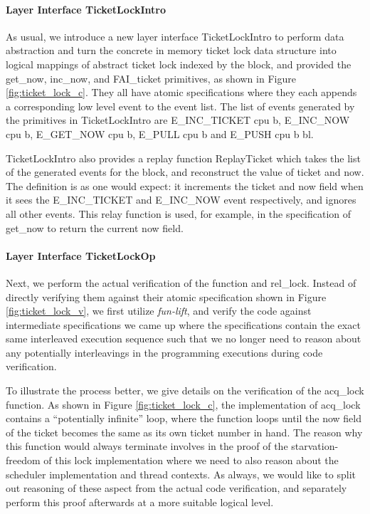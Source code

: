 \paragraph{Layer Interface TicketLockIntro}
As usual, we introduce a new layer interface TicketLockIntro to perform data
abstraction and turn the concrete in memory ticket lock
data structure into logical mappings of abstract ticket lock indexed by the block,
and provided the \textsf{get\_now}, \textsf{inc\_now}, and \textsf{FAI\_ticket}
primitives, as shown in Figure \ref{fig:ticket_lock_c}. They all have atomic specifications
where they each appends a corresponding low level event to the event list.
The list of events generated by the primitives in TicketLockIntro are
\textsf{E\_INC\_TICKET cpu b}, \textsf{E\_INC\_NOW cpu b}, \textsf{E\_GET\_NOW cpu b}, 
\textsf{E\_PULL cpu b} and \textsf{E\_PUSH cpu b bl}.

TicketLockIntro also provides a replay function \textsf{ReplayTicket} which takes the
list of the generated events for the block, and reconstruct the value of \textsf{ticket} and
\textsf{now}. The definition is as one would expect: it increments the \textsf{ticket} and
\textsf{now} field when it sees the \textsf{E\_INC\_TICKET} and \textsf{E\_INC\_NOW}
event respectively, and ignores all other events. This relay function is used, for example,
in the specification of \textsf{get\_now} to return the current \textsf{now} field.


\paragraph{Layer Interface TicketLockOp}

Next, we perform the actual verification of the function  and \textsf{rel\_lock}.
Instead of directly verifying them against their atomic specification shown in Figure
\ref{fig:ticket_lock_v}, we first utilize \emph{fun-lift}, and verify the code against
intermediate specifications we came up where the specifications contain the exact same
interleaved execution sequence such that we no longer need to reason about
any potentially interleavings in the programming executions during code verification.

To illustrate the process better, we give details on the verification of the \textsf{acq\_lock}
function. As shown in Figure \ref{fig:ticket_lock_c}, the implementation of \textsf{acq\_lock}
contains a ``potentially infinite'' loop, where the function loops until the \textsf{now} field
of the ticket becomes the same as its own ticket number in hand.
The reason why this function would always terminate involves in the proof of the starvation-freedom
of this lock implementation where we need to also reason about the scheduler implementation and
thread contexts. As always, we would like to split out reasoning of these aspect from the actual
code verification, and separately perform this proof afterwards at a more suitable logical level.

